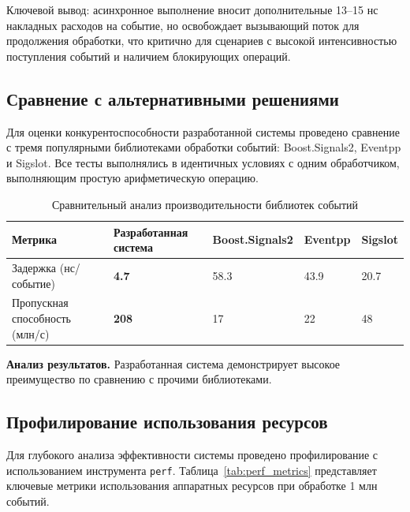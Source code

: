 Ключевой вывод: асинхронное выполнение вносит дополнительные 13--15 нс накладных расходов на событие, но освобождает вызывающий поток для продолжения обработки, что критично для сценариев с высокой интенсивностью поступления событий и наличием блокирующих операций.

\subsection{Сравнение с альтернативными решениями}

Для оценки конкурентоспособности разработанной системы проведено сравнение с тремя популярными библиотеками обработки событий: Boost.Signals2, Eventpp и Sigslot. Все тесты выполнялись в идентичных условиях с одним обработчиком, выполняющим простую арифметическую операцию.

\begin{table}[H]
\centering
\footnotesize
\caption{Сравнительный анализ производительности библиотек событий}
\label{tab:library_comparison}
\begin{tabularx}{\textwidth}{lXXXX}
\toprule
\textbf{Метрика} & \textbf{Разработанная система} & \textbf{Boost.Signals2} & \textbf{Eventpp} & \textbf{Sigslot} \\
\midrule
Задержка (нс/событие) & \textbf{4.7} & 58.3 & 43.9 & 20.7 \\
Пропускная способность (млн/с) & \textbf{208} & 17 & 22 & 48 \\
\bottomrule
\end{tabularx}
\end{table}

\textbf{Анализ результатов.} Разработанная система демонстрирует высокое преимущество по сравнению с прочими библиотеками.

\subsection{Профилирование использования ресурсов}

Для глубокого анализа эффективности системы проведено профилирование с использованием инструмента \texttt{perf}. Таблица~\ref{tab:perf_metrics} представляет ключевые метрики использования аппаратных ресурсов при обработке 1 млн событий.

